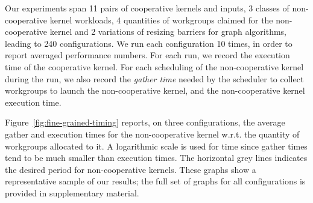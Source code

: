 \documentclass[sigconf]{acmart}
\newcommand{\myfiglong}{Figure~}
\begin{document}
{Our experiments span 11 pairs of cooperative kernels and inputs, 3
classes of non-cooperative kernel workloads, 4 quantities of
workgroups claimed for the non-cooperative kernel and 2 variations of
resizing barriers for graph algorithms, leading to 240 configurations.
We run each configuration 10 times, in order to report averaged
performance numbers. For each run, we record the execution time of the
cooperative kernel. For each scheduling of the non-cooperative kernel
during the run, we also record the \emph{gather time} needed by the
scheduler to collect workgroups to launch the non-cooperative kernel,
and the non-cooperative kernel execution time.
%




%
\myfiglong\ref{fig:fine-grained-timing} reports, on three
configurations, the average gather and execution times for the
non-cooperative kernel w.r.t. the quantity of workgroups allocated to
it.  A logarithmic scale is used for time since gather times tend to
be much smaller than execution times. The horizontal grey lines
indicates the desired period for non-cooperative kernels.  These
graphs show a representative sample of our results; the full set of
graphs for all configurations is provided in supplementary material.

}
\end{document}
